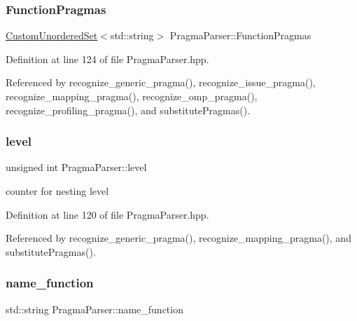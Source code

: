 \subsubsection{\texorpdfstring{Function\+Pragmas}{FunctionPragmas}}
{\footnotesize\ttfamily \hyperlink{classCustomUnorderedSet}{Custom\+Unordered\+Set}$<$std\+::string$>$ Pragma\+Parser\+::\+Function\+Pragmas\hspace{0.3cm}{\ttfamily [private]}}



Definition at line 124 of file Pragma\+Parser.\+hpp.



Referenced by recognize\+\_\+generic\+\_\+pragma(), recognize\+\_\+issue\+\_\+pragma(), recognize\+\_\+mapping\+\_\+pragma(), recognize\+\_\+omp\+\_\+pragma(), recognize\+\_\+profiling\+\_\+pragma(), and substitute\+Pragmas().

\mbox{\label{classPragmaParser_afd2c745d8eb46b37724f5741721bf891}} 
\subsubsection{\texorpdfstring{level}{level}}
{\footnotesize\ttfamily unsigned int Pragma\+Parser\+::level\hspace{0.3cm}{\ttfamily [private]}}



counter for nesting level 



Definition at line 120 of file Pragma\+Parser.\+hpp.



Referenced by recognize\+\_\+generic\+\_\+pragma(), recognize\+\_\+mapping\+\_\+pragma(), and substitute\+Pragmas().

\mbox{\label{classPragmaParser_a3f6eb9715243421172eef37a8db6cc0f}} 
\subsubsection{\texorpdfstring{name\+\_\+function}{name\_function}}
{\footnotesize\ttfamily std\+::string Pragma\+Parser\+::name\+\_\+function\hspace{0.3cm}{\ttfamily [private]}}



